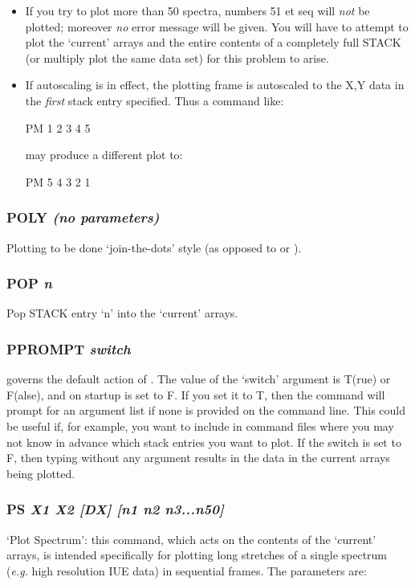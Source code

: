 \documentclass[twoside,11pt,noabs,nolof]{starlink}
\providecommand{\dipcom}[3]{\subsubsection*{\label{COM:#1}\xlabel{COM:#1}\textbf{#1} \emph{#2}}}
\begin{document}
\begin{itemize}

\item If you try to plot more than 50 spectra, numbers 51 et seq will
\emph{not} be plotted; moreover \emph{no} error message will be given.
You will have to attempt to plot the `current' arrays and the entire
contents of a completely full STACK (or multiply plot the same
data set) for this problem to arise.

\item If autoscaling is in effect, the plotting frame is autoscaled to
the X,Y data in the \emph{first} stack entry specified. Thus a command
like:

\begin{terminalv}
PM 1 2 3 4 5
\end{terminalv}

may produce a different plot to:

\begin{terminalv}
PM 5 4 3 2 1
\end{terminalv}

\end{itemize}

\dipcom{POLY}{(no parameters)}{Causes plots to be done 'join-the-dots' style}
Plotting to be done `join-the-dots' style (as opposed to   or ).

\dipcom{POP}{n}{Pops a stack entry into the current arrays}
Pop STACK entry `n' into the `current' arrays.

\dipcom{PPROMPT}{switch}{Controls which prompts are issued by {\texttt{PM}}}
  governs the default action of .  The value of the `switch'
argument is T(rue) or F(alse), and on startup is set to F. If you set
it to T, then the   command will prompt for an argument list if none
is provided on the command line. This could be useful if, for example,
you want to include   in command files where you may not know in
advance which stack entries you want to plot. If the switch is set to
F, then typing   without any argument results in the data in the
current arrays being plotted.

\dipcom{PS}{X1 X2 [DX] [n1 n2 n3...n50]}{Plots long stretches from a single spectrum}
`Plot Spectrum': this command, which acts on the contents of the
`current' arrays, is intended specifically for plotting long stretches
of a single spectrum (\emph{e.g.} high resolution IUE data) in
sequential frames. The parameters are:
\end{document}
